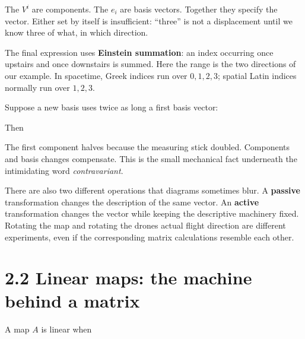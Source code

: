 \documentclass[
  11pt,
  letterpaper,
  oneside,
  openany]{scrbook}
\begin{document}
The \(V^i\) are components. The \(e_i\) are basis vectors. Together they
specify the vector. Either set by itself is insufficient: ``three'' is
not a displacement until we know three of what, in which direction.

The final expression uses \textbf{Einstein summation}: an index
occurring once upstairs and once downstairs is summed. Here the range is
the two directions of our example. In spacetime, Greek indices run over
\(0,1,2,3\); spatial Latin indices normally run over \(1,2,3\).

Suppose a new basis uses twice as long a first basis vector:

\begin{center}
\begingroup
{}
\ifdim\wd\grmathbox>\linewidth
\resizebox{\linewidth}{!}{\usebox{\grmathbox}}
\else\usebox{\grmathbox}\fi
\endgroup
\end{center}

Then

\begin{center}
\begingroup
{}
\ifdim\wd\grmathbox>\linewidth
\resizebox{\linewidth}{!}{\usebox{\grmathbox}}
\else\usebox{\grmathbox}\fi
\endgroup
\end{center}

The first component halves because the measuring stick doubled.
Components and basis changes compensate. This is the small mechanical
fact underneath the intimidating word \emph{contravariant}.

There are also two different operations that diagrams sometimes blur. A
\textbf{passive} transformation changes the description of the same
vector. An \textbf{active} transformation changes the vector while
keeping the descriptive machinery fixed. Rotating the map and rotating
the drone\textquotesingle s actual flight direction are different
experiments, even if the corresponding matrix calculations resemble each
other.

\hypertarget{linear-maps-the-machine-behind-a-matrix}{%
\section{2.2 Linear maps: the machine behind a
matrix}\label{linear-maps-the-machine-behind-a-matrix}}

A map \(A\) is linear when
\end{document}
